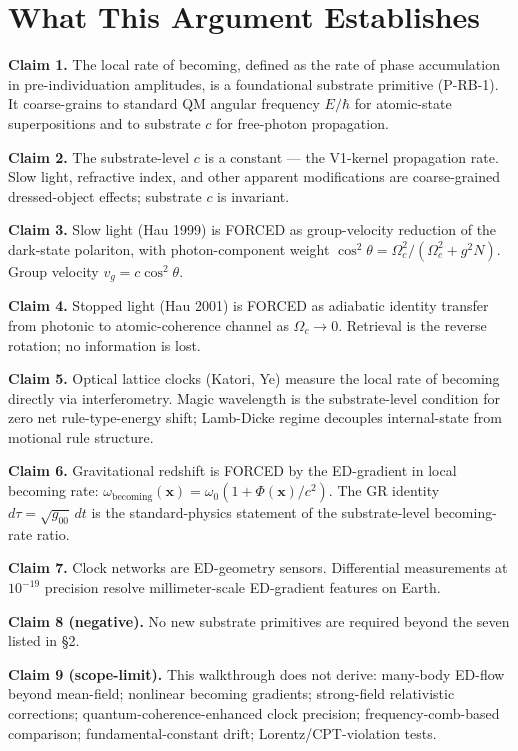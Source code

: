 \documentclass[11pt,a4paper]{article}
\begin{document}
\section{What This Argument Establishes}

\textbf{Claim 1.} The local rate of becoming, defined as the rate of phase accumulation in pre-individuation amplitudes, is a foundational substrate primitive (P-RB-1). It coarse-grains to standard QM angular frequency $E/\hbar$ for atomic-state superpositions and to substrate $c$ for free-photon propagation.

\textbf{Claim 2.} The substrate-level $c$ is a constant --- the V1-kernel propagation rate. Slow light, refractive index, and other apparent modifications are coarse-grained dressed-object effects; substrate $c$ is invariant.

\textbf{Claim 3.} Slow light (Hau 1999) is FORCED as group-velocity reduction of the dark-state polariton, with photon-component weight $\cos^2\theta = \Omega_c^2/(\Omega_c^2 + g^2 N)$. Group velocity $v_g = c\cos^2\theta$.

\textbf{Claim 4.} Stopped light (Hau 2001) is FORCED as adiabatic identity transfer from photonic to atomic-coherence channel as $\Omega_c \to 0$. Retrieval is the reverse rotation; no information is lost.

\textbf{Claim 5.} Optical lattice clocks (Katori, Ye) measure the local rate of becoming directly via interferometry. Magic wavelength is the substrate-level condition for zero net rule-type-energy shift; Lamb-Dicke regime decouples internal-state from motional rule structure.

\textbf{Claim 6.} Gravitational redshift is FORCED by the ED-gradient in local becoming rate: $\omega_{\mathrm{becoming}}(\mathbf{x}) = \omega_0(1 + \Phi(\mathbf{x})/c^2)$. The GR identity $d\tau = \sqrt{g_{00}}\, dt$ is the standard-physics statement of the substrate-level becoming-rate ratio.

\textbf{Claim 7.} Clock networks are ED-geometry sensors. Differential measurements at $10^{-19}$ precision resolve millimeter-scale ED-gradient features on Earth.

\textbf{Claim 8 (negative).} No new substrate primitives are required beyond the seven listed in \S2.

\textbf{Claim 9 (scope-limit).} This walkthrough does not derive: many-body ED-flow beyond mean-field; nonlinear becoming gradients; strong-field relativistic corrections; quantum-coherence-enhanced clock precision; frequency-comb-based comparison; fundamental-constant drift; Lorentz/CPT-violation tests.
\end{document}
